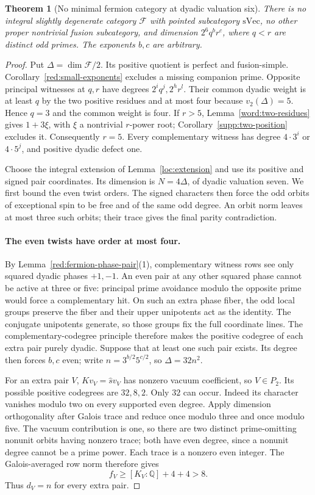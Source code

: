 \documentclass[11pt,a4paper]{article}
\numberwithin{equation}{section}
\newtheorem{theorem}{Theorem}[section]
\begin{document}
\begin{theorem}[No minimal fermion category at dyadic valuation six]
\label{red:fermion-six}
There is no integral slightly degenerate category $\mathcal F$
with pointed subcategory $\mathrm{sVec}$, no other proper
nontrivial fusion subcategory, and dimension $2^6q^br^c$, where
$q<r$ are distinct odd primes. The exponents $b,c$ are arbitrary.
\end{theorem}
\begin{proof}
Put $\Delta=\dim\mathcal F/2$. Its positive quotient is perfect
and fusion-simple. Corollary~\ref{red:small-exponents} excludes a
missing companion prime. Opposite principal witnesses at $q,r$ have
degrees $2^i q^j,2^h r^l$. Their common dyadic weight is at least
$q$ by the two positive residues and at most four because
$v_2(\Delta)=5$. Hence $q=3$ and the common weight is four.
If $r>5$, Lemma~\ref{word:two-residues} gives $1+3\xi$, with $\xi$
a nontrivial $r$-power root; Corollary~\ref{supp:two-position} excludes it. Consequently $r=5$. Every complementary witness
has degree $4\cdot3^i$ or $4\cdot5^j$, and positive dyadic
defect one.

Choose the integral extension of Lemma~\ref{loc:extension}
and use its positive and signed pair coordinates.
Its dimension is $N=4\Delta$, of dyadic valuation seven.
We first bound the even twist orders. The signed characters then force the
odd orbits of exceptional spin to be free and of the same odd degree.
An orbit norm leaves at most three such orbits; their trace gives the
final parity contradiction.

\paragraph{The even twists have order at most four.}
By Lemma~\ref{red:fermion-phase-pair}(1), complementary witness
rows see only squared dyadic phases $+1,-1$. An even pair at
any other squared phase cannot be active at three or five:
principal prime avoidance modulo the opposite prime would force
a complementary hit. On such an extra phase fiber, the odd local
groups preserve the fiber and their upper unipotents act as the
identity. The conjugate unipotents generate, so those groups fix
the full coordinate lines. The complementary-codegree principle
therefore makes the positive codegree of each extra pair purely
dyadic. Suppose that at least one such pair exists. Its degree then
forces $b,c$ even; write
$n=3^{b/2}5^{c/2}$, so $\Delta=32n^2$.

For an extra pair $V$, $K v_V=\widehat s v_V$ has nonzero
vacuum coefficient, so $V\in P_2$. Its possible positive
codegrees are $32,8,2$. Only $32$ can occur. Indeed its character
vanishes modulo two on every supported even degree. Apply
dimension orthogonality after Galois trace and reduce once modulo
three and once modulo five. The vacuum contribution is one, so
there are two distinct prime-omitting nonunit orbits having
nonzero trace; both have even degree, since a nonunit degree
cannot be a prime power. Each trace is a nonzero even integer.
The Galois-averaged row norm therefore gives
\[
                       f_V\ge [K_V:\mathbb Q]+4+4>8.
\]
Thus $d_V=n$ for every extra pair.


\end{proof}
\end{document}
